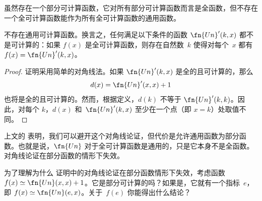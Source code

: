 \documentclass[../../../include/open-logic-section]{subfiles}
\begin{document}


虽然存在一个部分可计算函数，它对所有部分可计算函数而言是全函数，但不存在一个全可计算函数能作为所有全可计算函数的通用函数。

\begin{thm}
不存在通用可计算函数。换言之，任何满足以下条件的函数 $\fn{Un}'(k, x)$ 都不是可计算的：如果 $f(x)$ 是全可计算函数，则存在自然数~$k$ 使得对每个~$x$ 都有 $f(x) = \fn{Un}'(k,x)$。
\end{thm}

\begin{proof}
证明采用简单的对角线法。如果 $\fn{Un}'(k,x)$ 是全的且可计算的，那么
\[
d(x) = \fn{Un}'(x, x) + 1
\]
也将是全的且可计算的。然而，根据定义，$d(k)$ 不等于 $\fn{Un}'(k,k)$。因此，对每个 $k$，$d(x)$ 和~$\fn{Un}'(k, x)$ 至少在一个点（即 $x = k$）处取值不同。
\end{proof}

\begin{explain}
上文的  表明，我们可以避开这个对角线论证，但代价是允许通用函数为部分函数。也就是说，$\fn{Un}$ 对于全可计算函数是通用的，只是它本身不是全函数。对角线论证在部分函数的情形下失效。
\end{explain}

\begin{prob}
为了理解为什么  证明中的对角线论证在部分函数情形下失效，考虑函数 $f(x) \simeq \fn{Un}(x,x)+1$。它是部分可计算的吗？如果是，它就有一个指标~$e$，即 $f(x) \simeq
  \fn{Un}(e,x)$。关于~$f(e)$ 你能得出什么结论？
\end{prob}
\end{document}
